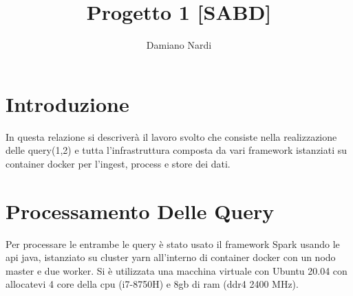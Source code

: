 \documentclass[acmsmall]{acmart}
\begin{document}
\title{Progetto 1 [SABD]}

\author{Damiano Nardi}












\maketitle{} 

\section{Introduzione}
In questa relazione si descriverà il lavoro svolto che consiste nella realizzazione delle query(1,2) e tutta l'infrastruttura  composta da vari framework istanziati su container docker per l'ingest, process e store dei dati.


\section{Processamento Delle Query}
Per processare le entrambe le query è stato usato il framework Spark usando le api java, istanziato su cluster yarn all'interno di container docker con un nodo master e due worker.
Si è utilizzata una macchina virtuale con Ubuntu 20.04 con allocatevi 4 core della cpu (i7-8750H) e 8gb di ram (ddr4 2400 MHz).
\end{document}
